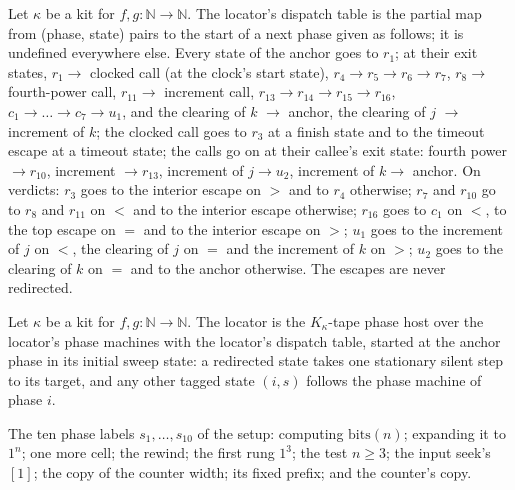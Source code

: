 \begin{definition}
\label{Turing.NTimeDiag.qyLocRed}
\leanok
{}
Let $\kappa$ be a kit for $f, g : \mathbb{N} \to \mathbb{N}$. The locator's dispatch table is the
partial map from (phase, state) pairs to the start of a next phase given as follows; it is
undefined everywhere else. Every state of the anchor goes to $r_1$; at their exit states,
$r_1 \to$ clocked call (at the clock's start state), $r_4 \to r_5 \to r_6 \to r_7$,
$r_8 \to$ fourth-power call, $r_{11} \to$ increment call, $r_{13} \to r_{14} \to r_{15} \to
r_{16}$, $c_1 \to \dots \to c_7 \to u_1$, and the clearing of $k$ $\to$ anchor, the clearing of
$j$ $\to$ increment of $k$; the clocked call goes to $r_3$ at a finish state and to the timeout
escape at a timeout state; the calls go on at their callee's exit state: fourth power $\to r_{10}$,
increment $\to r_{13}$, increment of $j \to u_2$, increment of $k \to$ anchor. On verdicts: $r_3$
goes to the interior escape on $>$ and to $r_4$ otherwise; $r_7$ and $r_{10}$ go to $r_8$ and
$r_{11}$ on $<$ and to the interior escape otherwise; $r_{16}$ goes to $c_1$ on $<$, to the top
escape on $=$ and to the interior escape on $>$; $u_1$ goes to the increment of $j$ on $<$, the
clearing of $j$ on $=$ and the increment of $k$ on $>$; $u_2$ goes to the clearing of $k$ on $=$
and to the anchor otherwise. The escapes are never redirected.
\end{definition}

\begin{definition}
\label{Turing.NTimeDiag.qyLoc}
\leanok
{}
Let $\kappa$ be a kit for $f, g : \mathbb{N} \to \mathbb{N}$. The locator is the $K_\kappa$-tape
phase host over the locator's phase machines with the locator's dispatch table, started at the
anchor phase in its initial sweep state: a redirected state takes one stationary silent step to its
target, and any other tagged state $(i, s)$ follows the phase machine of phase $i$.
\end{definition}

\begin{definition}
\label{Turing.NTimeDiag.QySK}
\leanok
The ten phase labels $s_1, \dots, s_{10}$ of the setup: computing $\mathrm{bits}(n)$; expanding it to
$1^n$; one more cell; the rewind; the first rung $1^3$; the test $n \ge 3$; the input seek's
$[1]$; the copy of the counter width; its fixed prefix; and the counter's copy.
\end{definition}

